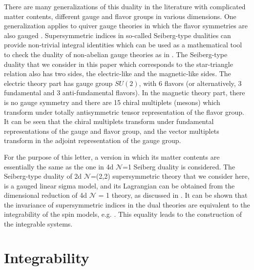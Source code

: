 \documentclass[a4paper,11pt]{article}%
\numberwithin{equation}{section}
\begin{document}
 There are  many  generalizations of this duality in the literature with complicated matter contents, different gauge and flavor groups in various dimensions. One generalization applies to quiver gauge theories in which the flavor symmetries are also gauged \cite{Berenstein:2002fi}. Supersymmetric indices in so-called Seiberg-type dualities can provide non-trivial integral identities which can be used as a mathematical tool to check the duality of non-abelian
gauge theories as in \cite{Dolan:2008qi,Spiridonov:2009za,Dolan:2011rp,Spiridonov:2011hf,Gahramanov:2013rda,Gahramanov:2014ona,Gahramanov:2015tta,Gahramanov:2016wxi}.
The Seiberg-type duality that we consider in this paper which corresponds to the star-triangle relation also has two sides, the electric-like and the magnetic-like sides. The electric theory part  has gauge group $SU(2)$, with 6 flavors (or alternatively, 3 fundamental and 3 anti-fundamental flavors). In the magnetic  theory part, there is no gauge symmetry and there are 15  chiral multiplets (mesons) which  transform under totally antisymmetric tensor representation of the flavor group. It can be seen that the chiral multiplets transform under fundamental representations of the gauge and flavor group, and the vector multiplets transform in the adjoint representation of the gauge group.

For the purpose of this letter,  a version
in which its  matter contents are essentially the same as the one in 4d $\mathcal{N}$=1 Seiberg duality is considered.
The Seiberg-type duality of 2d $\mathcal{N}$=(2,2) supersymmetric theory that we consider here, is a gauged linear sigma model, and its Lagrangian can
be obtained from the dimensional reduction of 4d $\mathcal{N}$ = 1 theory, as discussed in \cite{Honda:2015yha}. It can be shown that the invariance of supersymmetric indices in the dual theories are equivalent to the integrability of the spin models, e.g. \cite{Yamazaki:2013nra}. This equality leads to the construction of the integrable systems.





\section{Integrability } \label{Integ}
\end{document}
